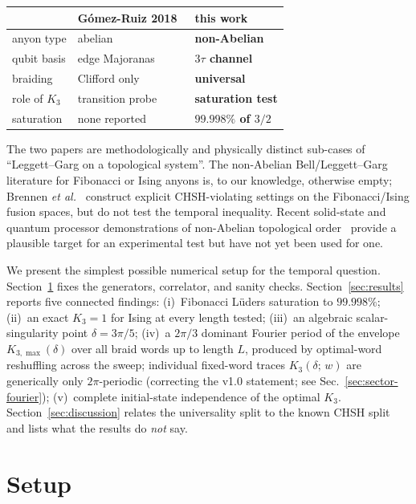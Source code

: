 \documentclass[aps,prx,reprint,amsmath,amssymb,floatfix,nofootinbib,superscriptaddress]{revtex4-2}
\begin{document}
\begin{center}\footnotesize
\setlength{\tabcolsep}{4pt}
\begin{tabular}{lll}
\toprule
                 & G\'omez-Ruiz 2018~\cite{GomezRuiz2018} & this work \\
\midrule
anyon type       & abelian            & \textbf{non-Abelian} \\
qubit basis      & edge Majoranas     & \textbf{$3\tau$ channel} \\
braiding         & Clifford only      & \textbf{universal} \\
role of $K_{3}$  & transition probe   & \textbf{saturation test} \\
saturation       & none reported      & \textbf{$99.998\%$ of $3/2$} \\
\bottomrule
\end{tabular}
\end{center}

\noindent The two papers are methodologically and physically distinct
sub-cases of ``Leggett--Garg on a topological system''. The
non-Abelian Bell/Leggett--Garg literature for Fibonacci or Ising
anyons is, to our knowledge, otherwise empty; Brennen \emph{et al.}~\cite{Brennen2009}
construct explicit CHSH-violating settings on the Fibonacci/Ising
fusion spaces, but do not test the temporal inequality. Recent
solid-state and quantum processor demonstrations of non-Abelian
topological order~\cite{Andersen2023,Iqbal2024,Xu2024,Minev2025}
provide a plausible target for an experimental test but have not yet
been used for one.

We present the simplest possible numerical setup for the temporal
question. Section~\ref{sec:setup} fixes the generators, correlator,
and sanity checks. Section~\ref{sec:results} reports five connected
findings: (i)~Fibonacci L\"uders saturation to $99.998\%$;
(ii)~an exact $K_{3}=1$ for Ising at every length tested;
(iii)~an algebraic scalar-singularity point $\delta = 3\pi/5$;
(iv)~a $2\pi/3$ dominant Fourier period of the envelope
$K_{3,\max}(\delta)$ over all braid words up to length $L$,
produced by optimal-word reshuffling across the sweep; individual
fixed-word traces $K_{3}(\delta;\,w)$ are generically only
$2\pi$-periodic
(correcting the v1.0 statement; see Sec.~\ref{sec:sector-fourier});
(v)~complete initial-state independence of the optimal $K_{3}$.
Section~\ref{sec:discussion} relates the universality split to the
known CHSH split and lists what the results do \emph{not} say.

\section{Setup}
\label{sec:setup}
\end{document}
